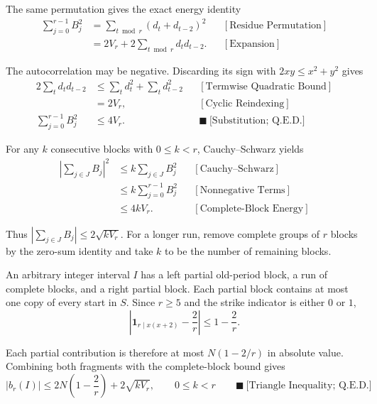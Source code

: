 The same permutation gives the exact energy identity
\begin{equation*}
\begin{aligned}
\sum_{j=0}^{r-1}B_j^2
&=\sum_{t\bmod r}(d_t+d_{t-2})^2
&&[\text{Residue Permutation}]\\
&=2V_r+2\sum_{t\bmod r}d_td_{t-2}.
&&[\text{Expansion}]
\end{aligned}
\end{equation*}

The autocorrelation may be negative. Discarding its sign with
$2xy\le x^2+y^2$ gives
\begin{equation*}
\begin{aligned}
2\sum_td_td_{t-2}
&\le\sum_td_t^2+\sum_td_{t-2}^2
&&[\text{Termwise Quadratic Bound}]\\
&=2V_r,
&&[\text{Cyclic Reindexing}]\\
\sum_{j=0}^{r-1}B_j^2
&\le4V_r.
&&\blacksquare\ \text{[Substitution; Q.E.D.]}
\end{aligned}
\end{equation*}

For any $k$ consecutive blocks with $0\le k\lt r$, Cauchy--Schwarz yields
\begin{equation*}
\begin{aligned}
\left|\sum_{j\in J}B_j\right|^2
&\le k\sum_{j\in J}B_j^2
&&[\text{Cauchy--Schwarz}]\\
&\le k\sum_{j=0}^{r-1}B_j^2
&&[\text{Nonnegative Terms}]\\
&\le4kV_r.
&&[\text{Complete-Block Energy}]
\end{aligned}
\end{equation*}

Thus $|\sum_{j\in J}B_j|\le2\sqrt{kV_r}$. For a longer run, remove complete
groups of $r$ blocks by the zero-sum identity and take $k$ to be the number of
remaining blocks.

An arbitrary integer interval $I$ has a left partial old-period block, a run
of complete blocks, and a right partial block. Each partial block contains at
most one copy of every start in $S$. Since $r\ge5$ and the strike indicator is
either $0$ or $1$,
\begin{equation*}
\left|
\mathbf1_{r\mid x(x+2)}-\frac2r
\right|
\le1-\frac2r.
\end{equation*}

Each partial contribution is therefore at most $N(1-2/r)$ in absolute value.
Combining both fragments with the complete-block bound gives
\begin{equation*}
|b_r(I)|
\le
2N\left(1-\frac2r\right)+2\sqrt{kV_r},
\qquad 0\le k\lt r
\qquad\blacksquare\ \text{[Triangle Inequality; Q.E.D.]}
\end{equation*}

